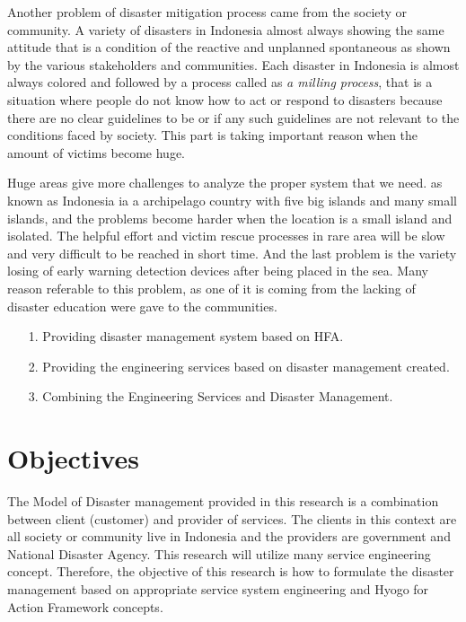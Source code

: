 Another problem of disaster mitigation process came from the society or community. A variety of disasters in Indonesia almost always showing  the same attitude that is a condition of the reactive and unplanned spontaneous as shown by the various stakeholders and communities. Each disaster in Indonesia is almost always colored and followed by a process called as \textit{a milling process}\cite{Kusmiati}, that is a situation where people do not know how to act or respond to disasters because there are no clear guidelines to be or if any such guidelines are not relevant to the conditions faced by society. This part is taking important reason when the amount of victims become huge.\par

Huge areas give more challenges to analyze the proper system that we need. as known as Indonesia ia a archipelago country with five big islands and many small islands, and the problems become harder when the location is a small island and isolated. The helpful effort and victim rescue processes in rare area will be slow and very difficult to be reached in short time. And the last problem is the variety losing of early warning detection devices after being placed in the sea\cite{AlatTsunamiHilang}. Many reason referable to this problem, as one of it is coming from the lacking of disaster education were gave to the communities.\par 

\begin{enumerate}
\setlength{\itemsep}{1.5pt}
\setlength{\parskip}{1.5pt}
\item[1.] Providing disaster management system based on HFA.
\item[2.] Providing the engineering services based on disaster management created.
\item[3.] Combining the Engineering Services and Disaster Management. 
\end{enumerate}\par

\section{Objectives}
The Model of Disaster management provided in this research is a combination between client (customer) and provider of services. The clients in this context are all society or community live in Indonesia and the providers are government and National Disaster Agency. This research will utilize many service engineering concept. Therefore, the objective of this research is how to formulate the disaster management based on appropriate service system engineering and Hyogo for Action Framework concepts.\par

